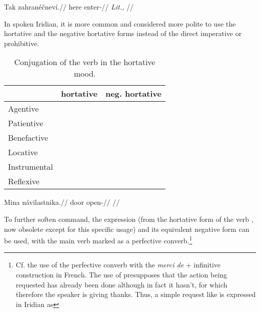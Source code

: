 \pex
\begingl
    \gla Tak zahran\'e\v{c}nev\'i.//
    \glb here enter-//
    \glft {} \textit{Lit.,} //
\endgl
\xe

In spoken Iridian, it is more common and considered more polite to use the
hortative and the negative hortative forms instead of the direct imperative
or prohibitive.

\begin{table}
    \footnotesize\sffamily
		\caption{Conjugation of the verb  in the hortative mood.}
		\label{tbl:hortative}
    \begin{tabu}to 0.7\textwidth{YYY}
         \toprule

         &{\sc hortative}&{\sc neg. hortative}  \\
         \midrule
         Agentive &
          &
         \\

         Patientive &
          &
         \\

         Benefactive &
          &
         \\

         Locative &
          &
         \\

         Instrumental &
          &
         \\

         Reflexive &
          &
         \\

         \bottomrule
    \end{tabu}

\end{table}

\pex
\begingl
\gla Mina n\'avilastnika.//
\glb door open-//
\glft {}//
\endgl
\xe

To further soften command, the expression  (from the hortative
form of the verb , now obsolete except for this
specific usage) and its equivalent negative form  can be used,
with the main verb marked as a perfective converb.\footnote{Cf. the use of the perfective converb with the \textit{merci de} + infinitive construction in French. The use of  presupposes that the action being requested has already been done although in fact it hasn't, for which therefore the speaker is giving thanks. Thus, a simple request like  is expressed in Iridian as }

